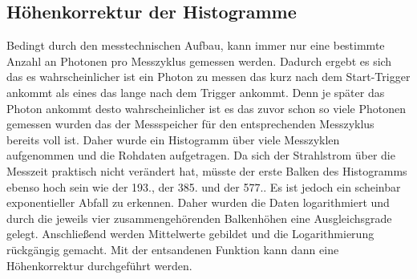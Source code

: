 \subsection{Höhenkorrektur der Histogramme}
\label{sec:TheorieKorrektur}
Bedingt durch den messtechnischen Aufbau, kann immer nur eine bestimmte Anzahl an Photonen pro Messzyklus
gemessen werden. Dadurch ergebt es sich das es wahrscheinlicher ist ein Photon zu messen das kurz nach 
dem Start-Trigger ankommt als eines das lange nach dem Trigger ankommt. Denn je später das Photon ankommt
desto wahrscheinlicher ist es das zuvor schon so viele Photonen gemessen wurden das der Messspeicher 
für den entsprechenden Messzyklus bereits voll ist. Daher wurde ein Histogramm über viele Messzyklen 
aufgenommen und die Rohdaten aufgetragen. Da sich der Strahlstrom über die Messzeit praktisch nicht 
verändert hat, müsste der erste Balken des Histogramms ebenso hoch sein wie der 193., der 385. und der 
577.. Es ist jedoch ein scheinbar exponentieller Abfall zu erkennen. Daher wurden die Daten logarithmiert 
und durch die jeweils vier zusammengehörenden Balkenhöhen eine Ausgleichsgrade gelegt. Anschließend werden
Mittelwerte gebildet und die Logarithmierung rückgängig gemacht. Mit der entsandenen Funktion kann dann 
eine Höhenkorrektur durchgeführt werden.  



